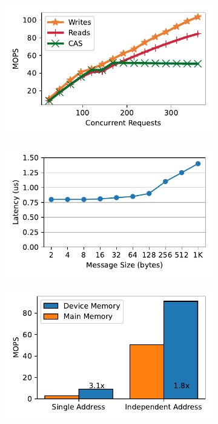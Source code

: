 \begin{figure}[t]
    \centering
    \begin{subfigure}{0.3\linewidth}
        \includegraphics[width=0.99\linewidth]{fig/rdma_concur.pdf}
    \end{subfigure}
    \begin{subfigure}{0.3\linewidth}
        \includegraphics[width=0.99\linewidth]{fig/rdma_latency.pdf}
    \end{subfigure}
    \begin{subfigure}{0.3\linewidth}
        \includegraphics[width=0.99\linewidth]{fig/rdma_cas_throughput.pdf}

\end{subfigure}
\end{figure}
